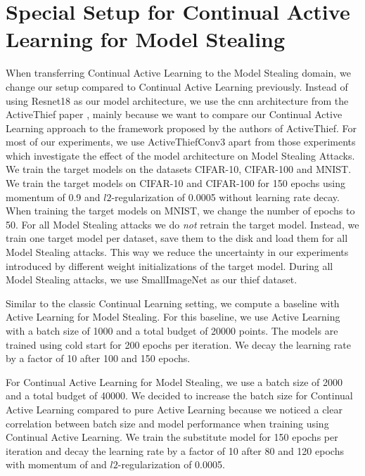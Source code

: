 \section{Special Setup for Continual Active Learning for Model Stealing}
\label{sec:Methodology:CALMSsetup}
When transferring Continual Active Learning to the Model Stealing domain, we change our setup compared to Continual Active Learning previously. Instead of using Resnet18 as our
model architecture, we use the \gls{cnn} architecture from the ActiveThief paper \cite{pal2020activethief}, mainly because we want to compare our Continual Active Learning approach to
the framework proposed by the authors of ActiveThief. For most of our experiments, we use ActiveThiefConv3 apart from those experiments which investigate the effect of the model 
architecture on Model Stealing Attacks. We train the target models on the datasets CIFAR-10, CIFAR-100 and MNIST. We train the target models on CIFAR-10 and CIFAR-100 for
150 epochs using momentum of 0.9 and $l2$-regularization of 0.0005 without learning rate decay. When training the target models on MNIST, we change the number of epochs to 50.
For all Model Stealing attacks we do \textit{not} retrain the target model. Instead, we train one target model per dataset, save them to the disk and load them for all Model Stealing
attacks. This way we reduce the uncertainty in our experiments introduced by different weight initializations of the target model. During all Model Stealing attacks, we use SmallImageNet
as our thief dataset. \par
Similar to the classic Continual Learning setting, we compute a baseline with Active Learning for Model Stealing. For this baseline, we use Active Learning with a batch size of 1000
and a total budget of 20000 points. The models are trained using cold start for 200 epochs per iteration. We decay the learning rate by a factor of 10 after 100 and 150 epochs. \par
For Continual Active Learning for Model Stealing, we use a batch size of 2000 and a total budget of 40000. We decided to increase the batch size for Continual Active Learning compared
to pure Active Learning because we noticed a clear correlation between batch size and model performance when training using Continual Active Learning. We train the substitute model for
150 epochs per iteration and decay the learning rate by a factor of 10 after 80 and 120 epochs with momentum of and $l2$-regularization of 0.0005.

